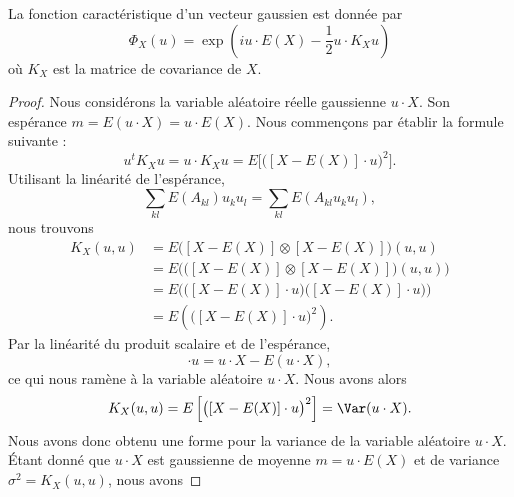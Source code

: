 \begin{proposition} \label{Propfmzuol}
    La fonction caractéristique d'un vecteur gaussien est donnée par
    \begin{equation}
        \Phi_X(u)=\exp\left( iu\cdot E(X)- \frac{ 1 }{2} u\cdot K_Xu \right)
    \end{equation}
    où \( K_X\) est la matrice de covariance de \( X\).
\end{proposition}

\begin{proof}
    Nous considérons la variable aléatoire réelle gaussienne \( u\cdot X\). Son espérance \( m=E(u\cdot X)=u\cdot E(X)\). Nous commençons par établir la formule suivante :
    \begin{equation}
        u^tK_Xu=u\cdot K_Xu=E\Big[ \big( [X-E(X)]\cdot u \big)^2 \Big].
    \end{equation}
    Utilisant la linéarité de l'espérance,
    \begin{equation}
        \sum_{kl}E(A_{kl})u_ku_l=\sum_{kl}E(A_{kl}u_ku_l),
    \end{equation}
    nous trouvons
    \begin{subequations}
        \begin{align}
            K_X(u,u)&=E\Big( [X-E(X)]\otimes [X-E(X)] \Big)(u,u)\\
            &=E\Big( \big( [X-E(X)]\otimes [X-E(X)] \big)(u,u) \Big)\\
            &=E\Big( \big( [X-E(X)]\cdot u \big)\big( [X-E(X)]\cdot u \big) \Big)\\
            &=E\left( \big( [X-E(X)]\cdot u \big)^2 \right).
        \end{align}
    \end{subequations}
    Par la linéarité du produit scalaire et de l'espérance,
    \begin{equation}
        [X-E(X)]\cdot u=u\cdot X-E(u\cdot X),
    \end{equation}
    ce qui nous ramène à la variable aléatoire \( u\cdot X\). Nous avons alors
    \begin{subequations}
        \begin{align}
            K_X(u,u)=E\left[ \big( [X-E(X)]\cdot u \big)^2 \right]=\Var(u\cdot X).
        \end{align}
    \end{subequations}
    Nous avons donc obtenu une forme pour la variance de la variable aléatoire \( u\cdot X\). Étant donné que \( u\cdot X\) est gaussienne de moyenne \( m=u\cdot E(X)\) et de variance \( \sigma^2=K_X(u,u)\), nous avons

\end{proof}
